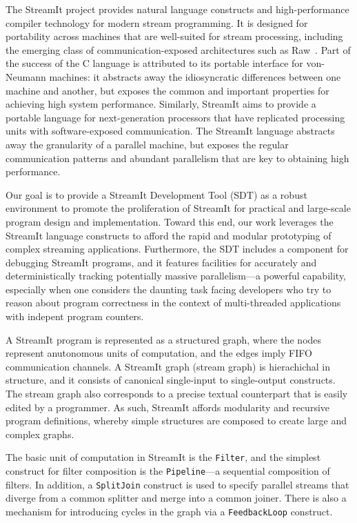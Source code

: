 \documentclass{csailabstractbook}
\begin{document}
The  StreamIt   project  provides  natural   language  constructs  and
high-performance compiler technology for modern stream programming. It
is designed for portability  across machines that are well-suited
for   stream    processing,   including   the    emerging   class   of
communication-exposed architectures such as Raw~\cite{raw}.  Part
of  the  success of  the  C language  is  attributed  to its  portable
interface   for   von-Neumann   machines:   it  abstracts   away   the
idiosyncratic differences between one machine and another, but exposes
the  common  and  important   properties  for  achieving  high  system
performance.  Similarly, StreamIt aims  to provide a portable language
for next-generation  processors that have  replicated processing units
with software-exposed communication.   The StreamIt language abstracts
away the  granularity of a  parallel machine, but exposes  the regular
communication  patterns  and  abundant  parallelism that  are  key  to
obtaining high performance.

Our goal is  to provide a StreamIt Development Tool  (SDT) as a robust
environment to promote the proliferation of StreamIt for practical and
large-scale program  design and  implementation. Toward this  end, our
work leverages  the StreamIt language  constructs to afford  the rapid
and      modular       prototyping      of      complex      streaming
applications. Furthermore, the SDT  includes a component for debugging
StreamIt  programs,  and it  features  facilities  for accurately  and
deterministically   tracking   potentially   massive   parallelism---a
powerful capability,  especially when one considers  the daunting task
facing developers who  try to reason about program  correctness in the
context of multi-threaded applications with indepent program counters.


A StreamIt  program is  represented as a  structured graph,  where the
nodes represent anutonomous units  of computation, and the edges imply
FIFO  communication  channels.  A  StreamIt graph  (stream  graph)  is
hierachichal in  structure, and it consists  of canonical single-input
to single-output  constructs. The stream  graph also corresponds  to a
precise textual counterpart that is easily edited by a programmer.  As
such, StreamIt  affords modularity and  recursive program definitions,
whereby  simple structures are  composed to  create large  and complex
graphs.

The basic unit of computation in StreamIt is the {\tt Filter}, and the
simplest construct  for filter  composition is the  {\tt Pipeline}---a
sequential  composition of  filters.  In  addition, a  {\tt SplitJoin}
construct  is used  to specify  parallel streams  that diverge  from a
common  splitter and  merge  into a  common  joiner. There  is also  a
mechanism for introducing cycles in the graph via a {\tt FeedbackLoop}
construct.
\end{document}

